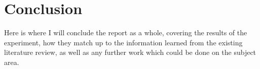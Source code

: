 \chapter{Conclusion}
\label{conclusion}
\begin{multicols*}{2}

	Here is where I will conclude the report as a whole, covering the results of the experiment, how they match up to the information learned from the existing literature review, as well as any further work which could be done on the subject area.

\end{multicols*}